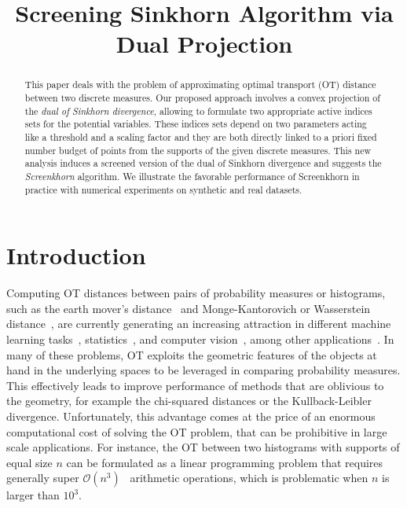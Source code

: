 \documentclass{article}
\title{Screening Sinkhorn Algorithm via Dual Projection}
\newcommand{\bigO}{\mathcal{O}}
\begin{document}
\maketitle

\begin{abstract}

This paper deals with the problem of approximating optimal transport (OT) distance between two discrete measures.
Our proposed approach involves a convex projection of the \emph{dual of Sinkhorn divergence}, allowing to formulate two appropriate active indices sets for the potential variables.
These indices sets depend on two parameters acting like a threshold and a scaling factor and they are both directly linked to a priori fixed number budget of points from the supports of the given discrete measures.
This new analysis induces a screened version of the dual of Sinkhorn divergence and suggests the \emph{Screenkhorn} algorithm.
We illustrate the favorable performance of Screenkhorn in practice with numerical experiments on synthetic and real datasets.
\end{abstract}

\section{Introduction}

Computing OT distances between pairs of probability measures or histograms, such as the earth mover's distance~\cite{werman1985,Rubner2000} and Monge-Kantorovich or Wasserstein distance~\cite{villani09optimal}, are currently generating an increasing attraction in different machine learning tasks~\cite{pmlr-v32-solomon14,kusnerb2015,pmlr-v70-arjovsky17a,ho2017}, statistics~\cite{frogner2015nips,panaretos2016,ebert2017ConstructionON,bigot2017,flamary2018WDA}, and computer vision~\cite{bonnel2011,Rubner2000,solomon2015}, among other applications~\cite{klouri17,peyre2019COTnowpublisher}.
In many of these problems, OT exploits the geometric features of the objects at hand in the underlying spaces to be leveraged in comparing probability measures.
This effectively leads to improve performance of methods that are oblivious to the geometry, for example the chi-squared distances or the Kullback-Leibler divergence.
Unfortunately, this advantage comes at the price of an enormous computational cost of solving the OT problem, that can be prohibitive in large scale applications.
For instance, the OT between two histograms with supports of equal size $n$ can be formulated as a linear programming problem that requires generally super $\bigO(n^3)$~\cite{pele2009} arithmetic operations, which is problematic when $n$ is larger than $10^3.$
\end{document}
